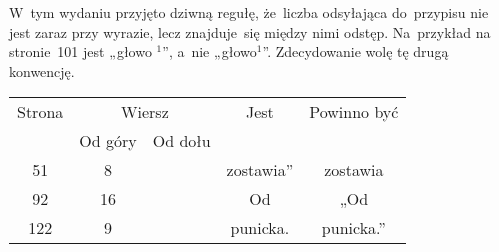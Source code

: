 \documentclass[a4paper,11pt]{article}
\begin{document}
\vspace{\spaceTwo}













\vspace{0em}



\vspace{0em}


\noindent
W~tym wydaniu przyjęto dziwną regułę, że~liczba odsyłająca do~przypisu nie
jest zaraz przy wyrazie, lecz znajduje~się między nimi odstęp. Na~przykład
na stronie~101 jest „głowo $^{ 1 }$”, a~nie „głowo$^{ 1 }$”. Zdecydowanie
wolę tę drugą konwencję.



\vspace{\spaceTwo}












\newpage








\begin{center}

  \begin{tabular}{|c|c|c|c|c|}
    \hline
    Strona & \multicolumn{2}{c|}{Wiersz} & Jest
                              & Powinno być \\ \cline{2-3}
    & Od góry & Od dołu & & \\
    \hline
    51  &  8 & & zostawia” & zostawia \\
    92  & 16 & & Od & „Od \\
    122 &  9 & & punicka. & punicka.” \\
    \hline
  \end{tabular}

\end{center}
\end{document}
